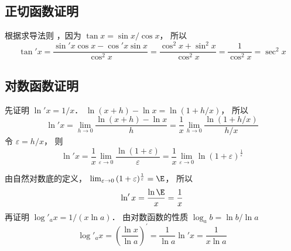 \subsection{正切函数证明}
根据求导法则%
，因为 $\tan x = {{\sin x}}/{{\cos x}}$， 所以
\begin{equation}
\tan' x = \frac{\sin' x \cos x - \cos' x\sin x}{\cos^2 x} = \frac{\cos^2x + \sin^2 x}{\cos^2 x} = \frac{1}{\cos ^2 x} = \sec ^2 x
\end{equation}
\subsection{对数函数证明}
先证明 $\ln' x = {1}/{x}$．  $\ln(x + h) - \ln x = \ln(1 + h/x)$， 所以
 \begin{equation}
\ln 'x = \mathop {\lim }\limits_{h \to 0} \frac{{\ln(x + h) - \ln x}}{h} = \frac{1}{x}\mathop {\lim }\limits_{h \to 0} \frac{{\ln(1 + h/x)}}{{h/x}}
\end{equation}
令 $\varepsilon  = h/x$， 则
\begin{equation}
\ln' x = \frac{1}{x}\mathop {\lim }\limits_{\varepsilon  \to 0} \frac{{\ln(1 + \varepsilon)}}{\varepsilon } = \frac{1}{x} \lim_{\varepsilon  \to 0} \ln(1 + \varepsilon)^{\frac{1}{\varepsilon }} 
\end{equation}
 
由自然对数底的定义， $\lim_{\varepsilon  \to 0} {(1 + \varepsilon)^{\frac{1}{\varepsilon }}} = \E$， 所以
 \begin{equation}
\ln 'x = \frac{{\ln \E}}{x} = \frac{1}{x}
\end{equation}
再证明 ${\log'_a}x = {1}/{(x\ln a)}$． 
由对数函数的性质 ${\log _a}b = {{\ln b}}/{{\ln a}}$
\begin{equation}
\log'_a x = {\left( {\frac{{\ln x}}{{\ln a}}} \right)^\prime } = \frac{1}{\ln a}\ln' x = \frac{1}{x\ln a}
\end{equation}


